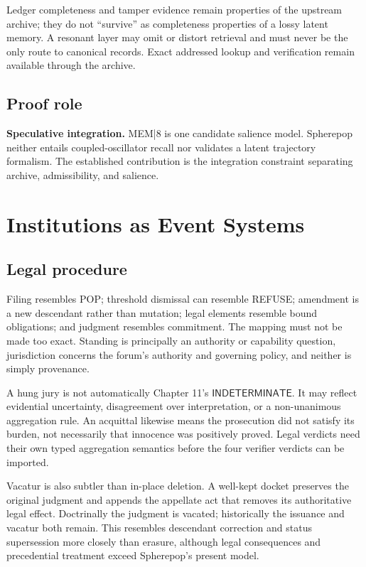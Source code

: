 \documentclass[11pt,openany]{book}
\newcommand{\Indeterminate}{\mathsf{INDETERMINATE}}
\begin{document}
Ledger completeness and tamper evidence remain properties of the upstream
archive; they do not “survive” as completeness properties of a lossy latent
memory. A resonant layer may omit or distort retrieval and must never be the
only route to canonical records. Exact addressed lookup and verification
remain available through the archive.

\section{Proof role}
\textbf{Speculative integration.} MEM|8 is one candidate salience model.
Spherepop neither entails coupled-oscillator recall nor validates a latent
trajectory formalism. The established contribution is the integration
constraint separating archive, admissibility, and salience.

\chapter{Institutions as Event Systems}
\section{Legal procedure}
Filing resembles POP; threshold dismissal can resemble REFUSE; amendment is a
new descendant rather than mutation; legal elements resemble bound
obligations; and judgment resembles commitment. The mapping must not be made
too exact. Standing is principally an authority or capability question,
jurisdiction concerns the forum's authority and governing policy, and neither
is simply provenance.

A hung jury is not automatically Chapter 11's \(\Indeterminate\). It may
reflect evidential uncertainty, disagreement over interpretation, or a
non-unanimous aggregation rule. An acquittal likewise means the prosecution
did not satisfy its burden, not necessarily that innocence was positively
proved. Legal verdicts need their own typed aggregation semantics before the
four verifier verdicts can be imported.

Vacatur is also subtler than in-place deletion. A well-kept docket preserves
the original judgment and appends the appellate act that removes its
authoritative legal effect. Doctrinally the judgment is vacated; historically
the issuance and vacatur both remain. This resembles descendant correction and
status supersession more closely than erasure, although legal consequences and
precedential treatment exceed Spherepop's present model.
\end{document}
